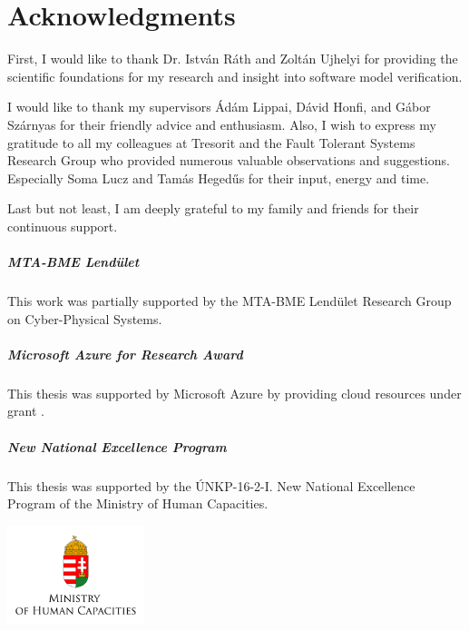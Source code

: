 \chapter*{Acknowledgments}
\label{chap:acknowledgments}
\thispagestyle{plain}

First, I would like to thank Dr. István Ráth and Zoltán Ujhelyi for providing the scientific foundations for my research and insight into software model verification.

I would like to thank my supervisors Ádám Lippai, Dávid Honfi, and Gábor Szárnyas for their friendly advice and enthusiasm. Also, I wish to express my gratitude to all my colleagues at Tresorit and the Fault Tolerant Systems Research Group who provided numerous valuable observations and suggestions. Especially Soma Lucz and Tamás Hegedűs for their input, energy and time.

Last but not least, I am deeply grateful to my family and friends for their continuous support.


\vfill

\paragraph{MTA-BME Lend\"ulet}
This work was partially supported by the MTA-BME Lend\"ulet Research Group on Cyber-Physical Systems.

\paragraph{Microsoft Azure for Research Award}
This thesis was supported by Microsoft Azure by providing cloud resources under grant .

\paragraph{New National Excellence Program}
This thesis was supported by the ÚNKP-16-2-I. New National Excellence Program of the Ministry of Human Capacities.

\begin{center}
\includegraphics[width=0.3\textwidth]{include/figures/min_en.jpg}
\end{center}
